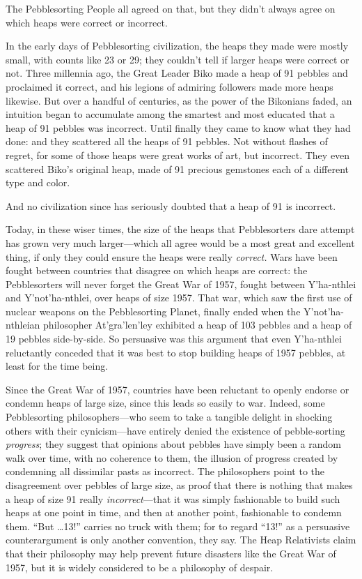{
 The Pebblesorting People all agreed on that, but they
didn't always agree on which heaps were correct or
incorrect.}

{
 In the early days of Pebblesorting civilization, the heaps they
made were mostly small, with counts like 23 or 29; they
couldn't tell if larger heaps were correct or not.
Three millennia ago, the Great Leader Biko made a heap of 91 pebbles
and proclaimed it correct, and his legions of admiring followers made
more heaps likewise. But over a handful of centuries, as the power of
the Bikonians faded, an intuition began to accumulate among the
smartest and most educated that a heap of 91 pebbles was incorrect.
Until finally they came to know what they had done: and they scattered
all the heaps of 91 pebbles. Not without flashes of regret, for some of
those heaps were great works of art, but incorrect. They even scattered
Biko's original heap, made of 91 precious gemstones
each of a different type and color.}

{
 And no civilization since has seriously doubted that a heap of 91
is incorrect.}

{
 Today, in these wiser times, the size of the heaps that
Pebblesorters dare attempt has grown very much larger---which all agree
would be a most great and excellent thing, if only they could ensure
the heaps were really \textit{correct.} Wars have been fought between
countries that disagree on which heaps are correct: the Pebblesorters
will never forget the Great War of 1957, fought between
Y'ha-nthlei and
Y'not'ha-nthlei, over heaps of size
1957. That war, which saw the first use of nuclear weapons on the
Pebblesorting Planet, finally ended when the
Y'not'ha-nthleian philosopher
At'gra'len'ley
exhibited a heap of 103 pebbles and a heap of 19 pebbles side-by-side.
So persuasive was this argument that even Y'ha-nthlei
reluctantly conceded that it was best to stop building heaps of 1957
pebbles, at least for the time being.}

{
 Since the Great War of 1957, countries have been reluctant to
openly endorse or condemn heaps of large size, since this leads so
easily to war. Indeed, some Pebblesorting philosophers---who seem to
take a tangible delight in shocking others with their cynicism---have
entirely denied the existence of pebble-sorting \textit{progress}; they
suggest that opinions about pebbles have simply been a random walk over
time, with no coherence to them, the illusion of progress created by
condemning all dissimilar pasts as incorrect. The philosophers point to
the disagreement over pebbles of large size, as proof that there is
nothing that makes a heap of size 91 really \textit{incorrect}{}---that
it was simply fashionable to build such heaps at one point in time, and
then at another point, fashionable to condemn them.
``But \ldots 13!'' carries no truck
with them; for to regard ``13!'' as
a persuasive counterargument is only another convention, they say. The
Heap Relativists claim that their philosophy may help prevent future
disasters like the Great War of 1957, but it is widely considered to be
a philosophy of despair.}

